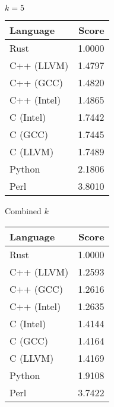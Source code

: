 \begin{subtable}{0.33\textwidth}
    \centering
    \caption{$k=5$}
    \label{table:runtime:regexp(5)}
    \begin{tabular}{|l|r|}
        \hline
        Language & Score \\
        \hline
        Rust & 1.0000 \\
        C++ (LLVM) & 1.4797 \\
        C++ (GCC) & 1.4820 \\
        C++ (Intel) & 1.4865 \\
        C (Intel) & 1.7442 \\
        C (GCC) & 1.7445 \\
        C (LLVM) & 1.7489 \\
        Python & 2.1806 \\
        Perl & 3.8010 \\
        \hline
    \end{tabular}
\end{subtable}%
\begin{subtable}{0.33\textwidth}
    \centering
    \caption{Combined $k$}
    \label{table:runtime:regexp:combined}
    \begin{tabular}{|l|r|}
        \hline
        Language & Score \\
        \hline
        Rust & 1.0000 \\
        C++ (LLVM) & 1.2593 \\
        C++ (GCC) & 1.2616 \\
        C++ (Intel) & 1.2635 \\
        C (Intel) & 1.4144 \\
        C (GCC) & 1.4164 \\
        C (LLVM) & 1.4169 \\
        Python & 1.9108 \\
        Perl & 3.7422 \\
        \hline
    \end{tabular}
\end{subtable}
